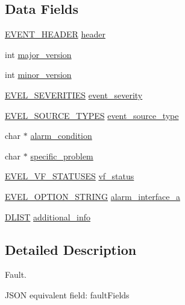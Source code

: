 \subsection*{Data Fields}
\begin{DoxyCompactItemize}
\item 
\hyperlink{evel_8h_aa0ea94c675729365ea7825c4fc7e06d8}{E\+V\+E\+N\+T\+\_\+\+H\+E\+A\+D\+ER} \hyperlink{structevent__fault_a4d189397d39b197f2c6e2527be76b5f9}{header}
\item 
int \hyperlink{structevent__fault_a3b46ee3d4e1b43e028b3f1f8d1bf3abd}{major\+\_\+version}
\item 
int \hyperlink{structevent__fault_ad53af12cb32e84758c8784d50921d0f1}{minor\+\_\+version}
\item 
\hyperlink{evel_8h_ad28dcc9cce27ecb7e4c9020107a6db9c}{E\+V\+E\+L\+\_\+\+S\+E\+V\+E\+R\+I\+T\+I\+ES} \hyperlink{structevent__fault_a0a8f81faa5b9c58bc826f308d472f696}{event\+\_\+severity}
\item 
\hyperlink{evel_8h_a304eae0d024005dc4c7031bdd774d64a}{E\+V\+E\+L\+\_\+\+S\+O\+U\+R\+C\+E\+\_\+\+T\+Y\+P\+ES} \hyperlink{structevent__fault_ae724b6a8c8056d11fae378da50063577}{event\+\_\+source\+\_\+type}
\item 
char $\ast$ \hyperlink{structevent__fault_ad8cee6bd12f2cd91f2c6e5b26b6fe99a}{alarm\+\_\+condition}
\item 
char $\ast$ \hyperlink{structevent__fault_ac527105fea5c184089d8b5e7440c5bef}{specific\+\_\+problem}
\item 
\hyperlink{evel_8h_a940888ae37017b9f85d793972994c8f0}{E\+V\+E\+L\+\_\+\+V\+F\+\_\+\+S\+T\+A\+T\+U\+S\+ES} \hyperlink{structevent__fault_aa82d21b95c0d1ef7ab6740a9b52f722f}{vf\+\_\+status}
\item 
\hyperlink{evel_8h_a0de5113a7b72de93c0c7b644f7ea7ec3}{E\+V\+E\+L\+\_\+\+O\+P\+T\+I\+O\+N\+\_\+\+S\+T\+R\+I\+NG} \hyperlink{structevent__fault_ab5fda001f74795dda5a6c09caabd7ffe}{alarm\+\_\+interface\+\_\+a}
\item 
\hyperlink{double__list_8h_a45f4a129042d9e1aa4ffd31fe13e4d14}{D\+L\+I\+ST} \hyperlink{structevent__fault_a68765630c9cb8e88a482778e0bab551d}{additional\+\_\+info}
\end{DoxyCompactItemize}


\subsection{Detailed Description}
Fault. 

J\+S\+ON equivalent field\+: fault\+Fields 

